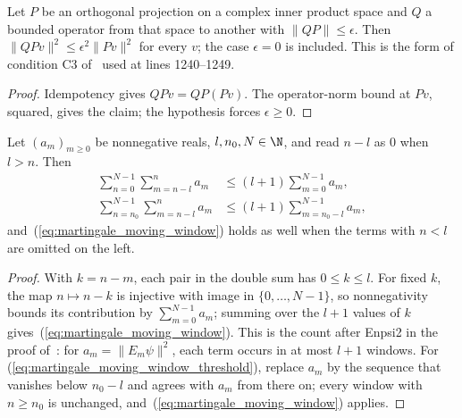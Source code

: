 \begin{lemma}
    \label{lem:martingale_c3_projection}
    \leanok
    Let $P$ be an orthogonal projection on a complex inner product space and $Q$ a
    bounded operator from that space to another with $\lVert QP\rVert\le\epsilon$.
    Then $\lVert QPv\rVert^2\le\epsilon^2\lVert Pv\rVert^2$ for every $v$; the case
    $\epsilon=0$ is included. This is the form of condition C3
    of~\cite[lines 1083--1094]{Nachtergaele1996Spectral} used at lines 1240--1249.
\end{lemma}
\begin{proof}\leanok
    Idempotency gives $QPv=QP(Pv)$. The operator-norm bound at $Pv$, squared, gives
    the claim; the hypothesis forces $\epsilon\ge0$.
\end{proof}

\begin{lemma}
    \label{lem:martingale_moving_window}
    \leanok
    Let $(a_m)_{m\ge0}$ be nonnegative reals, $l,n_0,N\in\N$, and read $n-l$ as $0$ when
    $l>n$. Then
    \begin{align}
        \sum_{n=0}^{N-1}\sum_{m=n-l}^{n}a_m   & \le(l+1)\sum_{m=0}^{N-1}a_m,
        \label{eq:martingale_moving_window}                                      \\
        \sum_{n=n_0}^{N-1}\sum_{m=n-l}^{n}a_m & \le(l+1)\sum_{m=n_0-l}^{N-1}a_m,
        \label{eq:martingale_moving_window_threshold}
    \end{align}
    and~(\ref{eq:martingale_moving_window}) holds as well when the terms with $n<l$
    are omitted on the left.
\end{lemma}
\begin{proof}\leanok
    With $k=n-m$, each pair in the double sum has $0\le k\le l$. For fixed $k$, the map
    $n\mapsto n-k$ is injective with image in $\{0,\dots,N-1\}$, so nonnegativity bounds
    its contribution by $\sum_{m=0}^{N-1}a_m$; summing over the $l+1$ values of $k$
    gives~(\ref{eq:martingale_moving_window}). This is the count after \textup{Enpsi2}
    in the proof of~\cite[Theorem~2.1(i), lines 1220--1255]{Nachtergaele1996Spectral}:
    for $a_m=\lVert E_m\psi\rVert^2$, each term occurs in at most $l+1$ windows. For
    (\ref{eq:martingale_moving_window_threshold}), replace $a_m$ by the sequence that
    vanishes below $n_0-l$ and agrees with $a_m$ from there on; every window with
    $n\ge n_0$ is unchanged, and~(\ref{eq:martingale_moving_window}) applies.
\end{proof}

